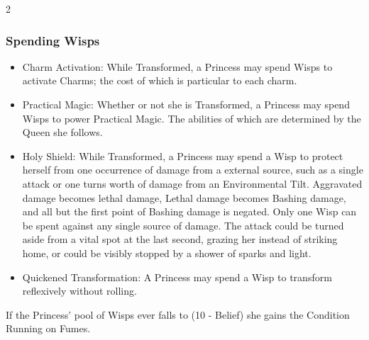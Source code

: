 \begin{multicols}{2}
\subsubsection*{Spending Wisps}
\begin{itemize}
\item    Charm Activation: While Transformed, a Princess may spend Wisps to activate Charms; the cost of which is particular to each charm.
\item    Practical Magic: Whether or not she is Transformed, a Princess may spend Wisps to power Practical Magic. The abilities of which are determined by the Queen she follows.
\item    Holy Shield: While Transformed, a Princess may spend a Wisp to protect herself from one occurrence of damage from a external source, such as a single attack or one turns worth of damage from an Environmental Tilt. Aggravated damage becomes lethal damage, Lethal damage becomes Bashing damage, and all but the first point of Bashing damage is negated. Only one Wisp can be spent against any single source of damage. The attack could be turned aside from a vital spot at the last second, grazing her instead of striking home, or could be visibly stopped by a shower of sparks and light.
\item    Quickened Transformation: A Princess may spend a Wisp to transform reflexively without rolling. 
\end{itemize}

\noindent If the Princess' pool of Wisps ever falls to (10 - Belief) she gains the Condition Running on Fumes.


\end{multicols}
